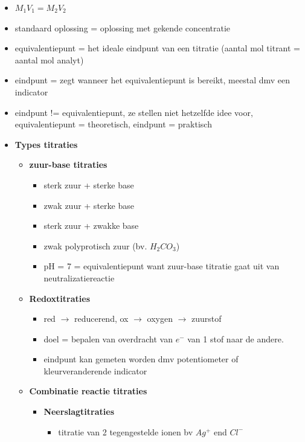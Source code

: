 \documentclass[10pt]{report}
\begin{document}
\begin{itemize}
    \item $M_1V_1 = M_2V_2$
    \item standaard oplossing = oplossing met gekende concentratie
    \item equivalentiepunt = het ideale eindpunt van een titratie (aantal mol titrant = aantal mol analyt)
    \item eindpunt = zegt wanneer het equivalentiepunt is bereikt, meestal dmv een indicator
    \item eindpunt != equivalentiepunt, ze stellen niet hetzelfde idee voor, equivalentiepunt = theoretisch, eindpunt = praktisch
    \item \textbf{Types titraties}
        \begin{itemize}
            \item \textbf{zuur-base titraties}
                \begin{itemize}
                    \item sterk zuur + sterke base
                    \item zwak zuur + sterke base
                    \item sterk zuur + zwakke base
                    \item zwak polyprotisch zuur (bv. $H_2CO_3$)
                    \item pH = 7 = equivalentiepunt want zuur-base titratie gaat uit van neutralizatiereactie
                \end{itemize}
            \item \textbf{Redoxtitraties}
                \begin{itemize}
                    \item red $\rightarrow$ reducerend, ox $\rightarrow$ oxygen $\rightarrow$ zuurstof
                    \item doel = bepalen van overdracht van $e^-$ van 1 stof naar de andere.
                    \item eindpunt kan gemeten worden dmv potentiometer of kleurveranderende indicator
                \end{itemize}
            \item \textbf{Combinatie reactie titraties}
                \begin{itemize}
                    \item \textbf{Neerslagtitraties}
                        \begin{itemize}
                            \item titratie van 2 tegengestelde ionen bv $Ag^+$ end $Cl^-$

\end{itemize}
\end{itemize}
\end{itemize}
\end{itemize}
\end{document}
